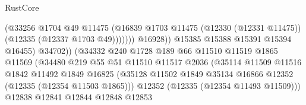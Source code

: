 \begin{lexlean}{RustCore}
\begin{coremodule}
                                                  (@33256
                                                    @1704
                                                    @49
                                                    @11475
                                                    (@16839
                                                      @1703
                                                      @11475
                                                      (@12330 (@12331 @11475))
                                                      (@12335 (@12337 @1703 @49)))))))
                                            @16928))
                                        @15385
                                        @15388
                                        @15391
                                        @15394
                                        @16455)
                                      @34702))
                                  (@34332
                                    @240
                                    @1728
                                    @189
                                    @66
                                    @11510
                                    @11519
                                    @1865
                                    @11569
                                    (@34480
                                      @219
                                      @55
                                      @51
                                      @11510
                                      @11517
                                      @2036
                                      (@35114
                                        @11509
                                        @11516
                                        @1842
                                        @11492
                                        @1849
                                        @16825
                                        (@35128
                                          @11502
                                          @1849
                                          @35134
                                          @16866
                                          @12352
                                          (@12335 (@12354 @11503 @1865)))
                                        @12352
                                        (@12335 (@12354 @11493 @11509)))
                                      @12838
                                      @12841
                                      @12844
                                      @12848
                                      @12853

\end{coremodule}
\end{lexlean}
